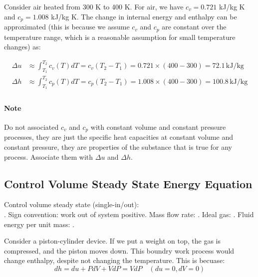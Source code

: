 \documentclass[11pt]{report}
\begin{document}
\begin{example}
    Consider air heated from 300 K to 400 K. For air, we have $c_v = 0.721$ kJ/kg K and $c_p = 1.008$ kJ/kg K. The change in internal energy and enthalpy can be approximated (this is because we assume $c_v$ and $c_p$ are constant over the temperature range, which is a reasonable assumption for small temperature changes) as:

    \begin{align*}
        \Delta u &\approx \int_{T_1}^{T_2} c_v(T) dT = c_v (T_2 - T_1) = 0.721 \times (400 - 300) = 72.1\, \text{kJ/kg} \\
        \Delta h &\approx \int_{T_1}^{T_2} c_p(T) dT = c_p (T_2 - T_1) = 1.008 \times (400 - 300) = 100.8\, \text{kJ/kg} \\
    \end{align*}
\end{example}

\paragraph{Note} Do not associated $c_v$ and $c_p$ with constant volume and constant pressure processes, they are just the specific heat capacities at constant volume and constant pressure, they are properties of the substance that is true for any process. Associate them with $\Delta u$ and $\Delta h$.
\subsection{Control Volume Steady State Energy Equation}
\begin{review}
Control volume steady state (single-in/out): \\ . Sign convention: work out of system positive.
Mass flow rate: . Ideal gas: . Fluid energy per unit mass: .
\end{review}
\begin{example}
    Consider a piston-cylinder device. If we put a weight on top, the gas is compressed, and the piston moves down. This boundry work process would change enthalpy, despite not changing the temperature. This is becuase:
    $$
        dh = du + PdV + VdP = VdP \quad (du = 0, dV = 0)
    $$
\end{example}
\end{document}
